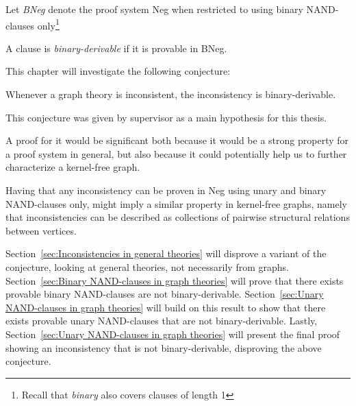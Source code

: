

\begin{definition}
   Let \textit{BNeg} denote the proof system Neg when restricted to using binary NAND-clauses only\footnote{Recall that \textit{binary} also covers clauses of length 1}
\end{definition}
\begin{definition}
  A clause is \textit{binary-derivable} if it is provable in BNeg.
\end{definition}
This chapter will investigate the following conjecture:
\begin{conjecture}
  Whenever a graph theory is inconsistent, the inconsistency is binary-derivable.
\end{conjecture}
This conjecture was given by supervisor as a main hypothesis for this thesis.

A proof for it would be significant both because it would be a strong property for a proof system in general, but also because it could potentially help us to further characterize a kernel-free graph.

Having that any inconsistency can be proven in Neg using unary and binary NAND-clauses only, might imply a similar property in kernel-free graphs, namely that inconsistencies can be described as collections of pairwise structural relations between vertices.

Section~\ref{sec:Inconsistencies in general theories} will disprove a variant of the conjecture, looking at general theories, not necessarily from graphs.
Section~\ref{sec:Binary NAND-clauses in graph theories} will prove that there exists provable binary NAND-clauses are not binary-derivable.
Section~\ref{sec:Unary NAND-clauses in graph theories} will build on this result to show that there exists provable unary NAND-clauses that are not binary-derivable.
Lastly, Section~\ref{sec:Unary NAND-clauses in graph theories} will present the final proof showing an inconsistency that is not binary-derivable, disproving the above conjecture. 
